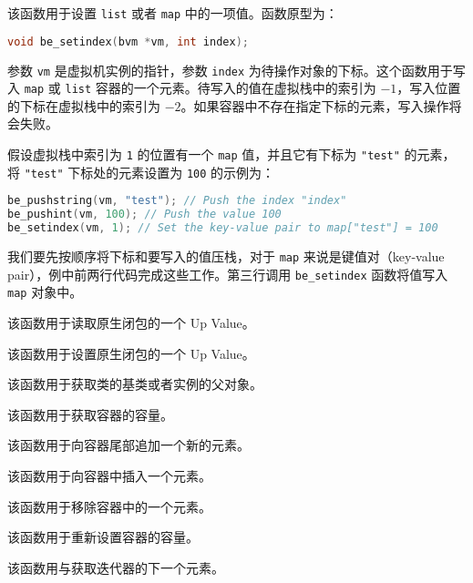 
该函数用于设置 \texttt{list} 或者 \texttt{map} 中的一项值。函数原型为：
\begin{lstlisting}[language=c, style=berry, numbers=none]
void be_setindex(bvm *vm, int index);
\end{lstlisting}
参数 \texttt{vm} 是虚拟机实例的指针，参数 \texttt{index} 为待操作对象的下标。这个函数用于写入 \texttt{map} 或 \texttt{list} 容器的一个元素。待写入的值在虚拟栈中的索引为 $-1$，写入位置的下标在虚拟栈中的索引为 $-2$。如果容器中不存在指定下标的元素，写入操作将会失败。

假设虚拟栈中索引为 \texttt{1} 的位置有一个 \texttt{map} 值，并且它有下标为 \texttt{"test"} 的元素，将 \texttt{"test"} 下标处的元素设置为 \texttt{100} 的示例为：
\begin{lstlisting}[language=c, style=berry]
be_pushstring(vm, "test"); // Push the index "index"
be_pushint(vm, 100); // Push the value 100
be_setindex(vm, 1); // Set the key-value pair to map["test"] = 100
\end{lstlisting}
我们要先按顺序将下标和要写入的值压栈，对于 \texttt{map} 来说是键值对（key-value pair），例中前两行代码完成这些工作。第三行调用 \texttt{be\_setindex} 函数将值写入 \texttt{map} 对象中。


该函数用于读取原生闭包的一个 Up Value。


该函数用于设置原生闭包的一个 Up Value。


该函数用于获取类的基类或者实例的父对象。


该函数用于获取容器的容量。


该函数用于向容器尾部追加一个新的元素。


该函数用于向容器中插入一个元素。


该函数用于移除容器中的一个元素。


该函数用于重新设置容器的容量。


该函数用与获取迭代器的下一个元素。

